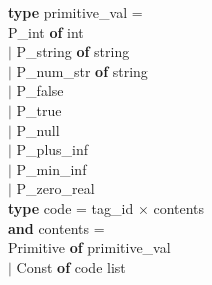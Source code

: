 
\noindent \textbf{type} primitive\_val = \\
\hspace*{1.2mm} \textsf{P\_int} \textbf{of} int \\
$\mid$ \textsf{P\_string} \textbf{of} string \\
$\mid$ \textsf{P\_num\_str} \textbf{of} string \\
$\mid$ \textsf{P\_false} \\
$\mid$ \textsf{P\_true} \\
$\mid$ \textsf{P\_null} \\
$\mid$ \textsf{P\_plus\_inf} \\
$\mid$ \textsf{P\_min\_inf} \\
$\mid$ \textsf{P\_zero\_real} \\

\noindent \textbf{type} code = tag\_id $\times$ contents \\

\noindent \textbf{and} contents = \\
\hspace*{1.2mm} \textsf{Primitive} \textbf{of} primitive\_val \\
$\mid$ \textsf{Const} \textbf{of} code \textsf{list}

\bigskip

